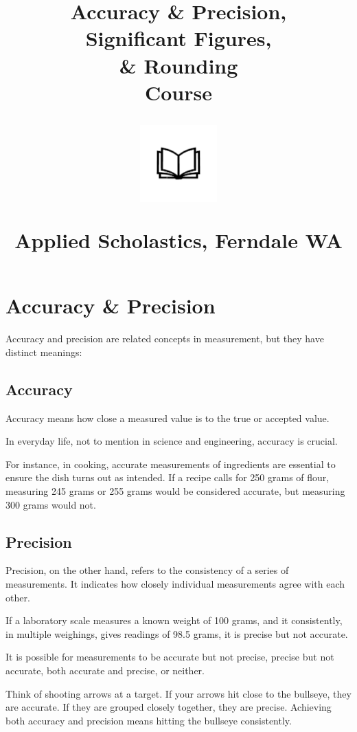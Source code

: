 \documentclass{article}
\author{}
\date{}
\title{\textbf{Accuracy \& Precision,\\ Significant Figures,\\ \& Rounding\\ Course}\\
\vspace{28pt}
\begin{center}
\includegraphics[width=4em]{ApS_logo.png}
\end{center}
\begin{normalsize}
Applied Scholastics, Ferndale WA
\end{normalsize}}
\begin{document}
\maketitle

\section*{Accuracy \& Precision}

Accuracy and precision are related concepts in measurement, but they have distinct meanings:

\subsection*{Accuracy}
Accuracy means how close a measured value is to the true or accepted value.

In everyday life, not to mention in science and engineering, accuracy is crucial.

For instance, in cooking, accurate measurements of ingredients are essential to ensure the dish turns out as intended. If a recipe calls for 250 grams of flour, measuring 245 grams or 255 grams would be considered accurate, but measuring 300 grams would not.

\subsection*{Precision}
Precision, on the other hand, refers to the consistency of a series of measurements. It indicates how closely individual measurements agree with each other.

If a laboratory scale measures a known weight of 100 grams, and it consistently, in multiple weighings, gives readings of 98.5 grams, it is precise but not accurate.

It is possible for measurements to be accurate but not precise, precise but not accurate, both accurate and precise, or neither.

Think of shooting arrows at a target. If your arrows hit close to the bullseye, they are accurate. If they are grouped closely together, they are precise. Achieving both accuracy and precision means hitting the bullseye consistently.
\end{document}
